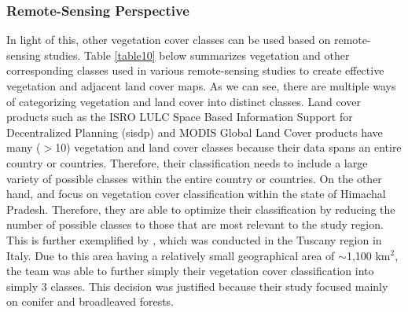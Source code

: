 \subsubsection{Remote-Sensing Perspective}

\justify
In light of this, other vegetation cover classes can be used based on remote-sensing studies. Table \ref{table10} below summarizes vegetation and other corresponding classes used in various remote-sensing studies to create effective vegetation and adjacent land cover maps. As we can see, there are multiple ways of categorizing vegetation and land cover into distinct classes. Land cover products such as the ISRO LULC Space Based Information Support for Decentralized Planning (\ac{sisdp}) and MODIS Global Land Cover products have many ($>$10) vegetation and land cover classes because their data spans an entire country or countries. Therefore, their classification needs to include a large variety of possible classes within the entire country or countries. On the other hand, \citealt{joshi2001} and \citealt{HPRS2009} focus on vegetation cover classification within the state of Himachal Pradesh. Therefore, they are able to optimize their classification by reducing the number of possible classes to those that are most relevant to the study region. This is further exemplified by \citealt{puletti2016}, which was conducted in the Tuscany region in Italy. Due to this area having a relatively small geographical area of $\sim$1,100 km$^2$, the team was able to further simply their vegetation cover classification into simply 3 classes. This decision was justified because their study focused mainly on conifer and broadleaved forests. 

